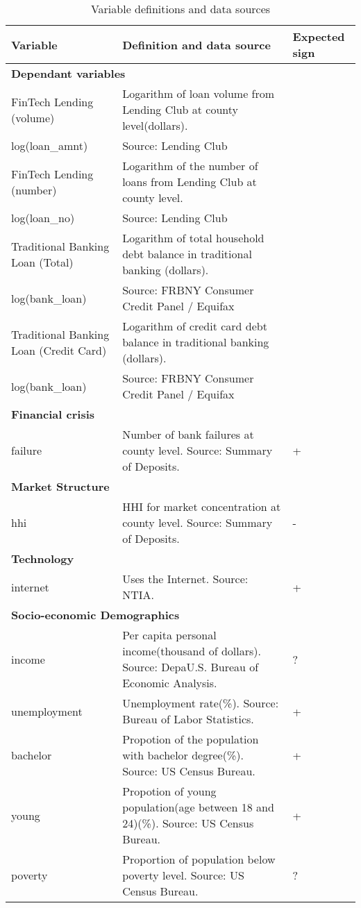 \documentclass[11pt, a4paper, leqno]{article}
\begin{document}
\begin{table}[!h!]\centering \caption{Variable definitions and data sources \label{vardef}}
\begin{tabularx}{\linewidth}{|p{4cm}|p{8cm}|p{2.2cm}|}
\hline
\textbf{Variable} & \textbf{Definition and data source} & \textbf{Expected sign} \\ 
\hline
\multicolumn{3}{|l|}{\textbf{Dependant variables}} \\ 
\hline
FinTech Lending (volume) & Logarithm of loan volume from Lending Club at county level(dollars). &  \\
log(loan\_amnt) & Source: Lending Club &  \\ 
\hline
FinTech Lending (number)  & Logarithm of the number of loans from Lending Club at county level. &   \\
log(loan\_no) & Source: Lending Club &  \\
\hline
Traditional Banking Loan (Total) & Logarithm of total household debt balance in traditional banking (dollars).  &   \\ 
log(bank\_loan) & Source: FRBNY Consumer Credit Panel / Equifax &   \\ 
\hline
Traditional Banking Loan (Credit Card) & Logarithm of credit card debt balance in traditional banking (dollars).  &   \\ 
log(bank\_loan) & Source: FRBNY Consumer Credit Panel / Equifax &   \\ 
\hline
\multicolumn{3}{|l|}{\textbf{Financial crisis}} \\ \hline
failure & Number of bank failures at county level. Source: Summary of Deposits.&  + \\ \hline
\multicolumn{3}{|l|}{\textbf{Market Structure}} \\ \hline
hhi & HHI for market concentration at county level. Source: Summary of Deposits.&  - \\ \hline
\multicolumn{3}{|l|}{\textbf{Technology}} \\ \hline
internet & Uses the Internet. Source: NTIA. &  + \\ \hline
\multicolumn{3}{|l|}{\textbf{Socio-economic Demographics}} \\ \hline
income & Per capita personal income(thousand of dollars). Source: DepaU.S. Bureau of Economic Analysis. &  ? \\ \hline
unemployment & Unemployment rate(\%). Source: Bureau of Labor Statistics.&  + \\ \hline
bachelor & Propotion of the population with bachelor degree(\%). Source: US Census Bureau.&  + \\ \hline
young & Propotion of young population(age between 18 and 24)(\%). Source: US Census Bureau. &  + \\ \hline
poverty & Proportion of population below poverty level. Source: US Census Bureau. & ? \\ \hline
\end{tabularx}
\end{table}
\end{document}
